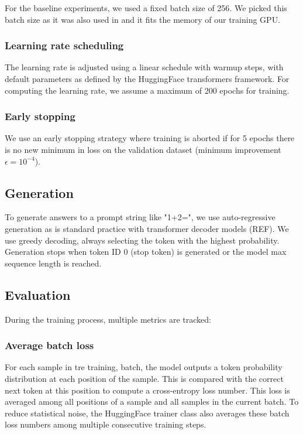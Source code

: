 For the baseline experiments, we used a fixed batch size of 256. We picked this batch size as it was also used in \cite{teaching} and it fits the memory of our training GPU.

\subsubsection{Learning rate scheduling}
\label{expsetup:learnrate}

The learning rate is adjusted using a linear schedule with warmup steps, with default parameters as defined by the HuggingFace transformers framework.
For computing the learning rate, we assume a maximum of 200 epochs for training.

\subsubsection{Early stopping}
\label{early_stopping}

We use an early stopping strategy where training is aborted if for 5 epochs there is no new minimum in loss on the validation dataset (minimum improvement $\epsilon=10^{-4}$).

\subsection{Generation}

To generate answers to a prompt string like "1+2=", we use auto-regressive generation as is standard practice with transformer decoder models (REF). We use greedy decoding, always selecting the token with the highest probability. Generation stops when token ID 0 (stop token) is generated or the model max sequence length is reached.
\label{model_generation}

\subsection{Evaluation}

During the training process, multiple metrics are tracked:

\subsubsection{Average batch loss}
For each sample in tre training, batch, the model outputs a token probability distribution at each position of the sample. This is compared with the correct next token at this position to compute a cross-entropy loss number. This loss is averaged among all positions of a sample and all samples in the current batch. To reduce statistical noise, the HuggingFace trainer class also averages these batch loss numbers among multiple consecutive training steps.

